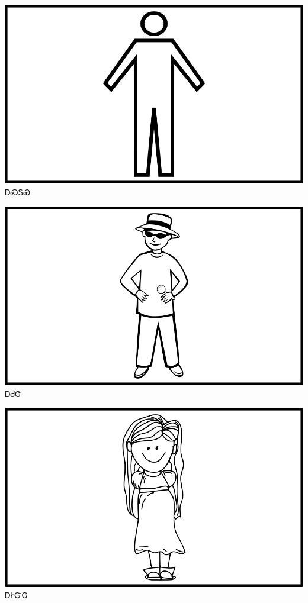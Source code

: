 \documentclass[avery5371]{flashcards}%
\begin{document}
    \begin{flashcard}{
        \includegraphics[width=0.95\columnwidth,height=.51\columnwidth,keepaspectratio]{../artwork/objects-animate/asgaya}
    }
        \Huge ᎠᏍᎦᏯ
    \end{flashcard}

    \begin{flashcard}{
        \includegraphics[width=0.95\columnwidth,height=.51\columnwidth,keepaspectratio]{../artwork/objects-animate/achuja}
    }
        \Huge ᎠᏧᏣ
    \end{flashcard}

    \begin{flashcard}{
        \includegraphics[width=0.95\columnwidth,height=.51\columnwidth,keepaspectratio]{../artwork/objects-animate/agehyuja}
    }
        \Huge ᎠᎨᏳᏣ
    \end{flashcard}
\end{document}

